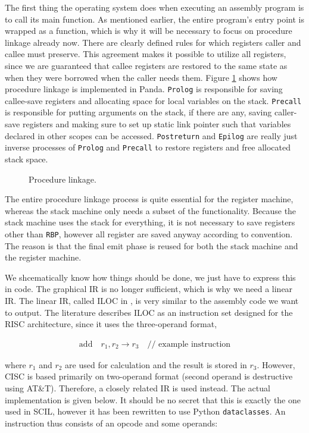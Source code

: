The first thing the operating system does when executing an assembly program is to call its main function. As mentioned earlier, the entire program's entry point is wrapped as a function, which is why it will be necessary to focus on procedure linkage already now. There are clearly defined rules for which registers caller and callee must preserve. This agreement makes it possible to utilize all registers, since we are guaranteed that callee registers are restored to the same state as when they were borrowed when the caller needs them. Figure \ref{fig:procedure} shows how procedure linkage is implemented in Panda. \texttt{Prolog} is responsible for saving callee-save registers and allocating space for local variables on the stack. \texttt{Precall} is responsible for putting arguments on the stack, if there are any, saving caller-save registers and making sure to set up static link pointer such that variables declared in other scopes can be accessed. \texttt{Postreturn} and \texttt{Epilog} are really just inverse processes of \texttt{Prolog} and \texttt{Precall} to restore registers and free allocated stack space.

\begin{figure}[H]
    \centering
    
    \caption{Procedure linkage.} 
    \label{fig:procedure}
\end{figure}

The entire procedure linkage process is quite essential for the register machine, whereas the stack machine only needs a subset of the functionality. Because the stack machine uses the stack for everything, it is not necessary to save registers other than \texttt{RBP}, however all register are saved anyway according to convention. The reason is that the final emit phase is reused for both the stack machine and the register machine.

We shcematically know how things should be done, we just have to express this in code. The graphical IR is no longer sufficient, which is why we need a linear IR. The linear IR, called ILOC in \cite[19]{EnginneringACompiler}, is very similar to the assembly code we want to output. The literature describes ILOC as an instruction set designed for the RISC architecture, since it uses the three-operand format,

\begin{align*}
\mathrm{add} \quad r_1, r_2 \rightarrow r_3 \quad \text{// example instruction}
\end{align*}

where $r_1$ and $r_2$ are used for calculation and the result is stored in $r_3$. However, CISC is based primarily on two-operand format (second operand is destructive using AT\&T). Therefore, a closely related IR is used instead. The actual implementation is given below. It should be no secret that this is exactly the one used in SCIL, however it has been rewritten to use Python \texttt{dataclasses}. An instruction thus consists of an opcode and some operands:

